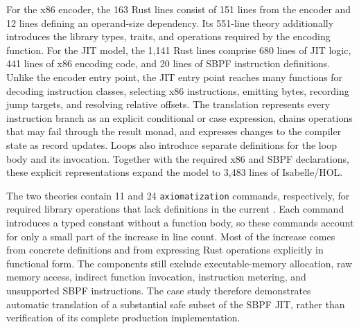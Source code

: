 For the x86 encoder, the 163 Rust lines consist of 151 lines from the encoder and 12 lines defining an operand-size dependency.
Its 551-line theory additionally introduces the library types, traits, and operations required by the encoding function.
For the JIT model, the 1,141 Rust lines comprise 680 lines of JIT logic, 441 lines of x86 encoding code, and 20 lines of SBPF instruction definitions.
Unlike the encoder entry point, the JIT entry point reaches many functions for decoding instruction classes, selecting x86 instructions, emitting bytes, recording jump targets, and resolving relative offsets.
The translation represents every instruction branch as an explicit conditional or case expression, chains operations that may fail through the result monad, and expresses changes to the compiler state as record updates.
Loops also introduce separate definitions for the loop body and its invocation.
Together with the required x86 and SBPF declarations, these explicit representations expand the model to 3,483 lines of Isabelle/HOL.


The two theories contain 11 and 24 \texttt{axiomatization} commands, respectively, for required library operations that lack definitions in the current \rprelude{}.
Each command introduces a typed constant without a function body, so these commands account for only a small part of the increase in line count.
Most of the increase comes from concrete definitions and from expressing Rust operations explicitly in functional form.
The components still exclude executable-memory allocation, raw memory access, indirect function invocation, instruction metering, and unsupported SBPF instructions.
The case study therefore demonstrates automatic translation of a substantial safe subset of the SBPF JIT, rather than verification of its complete production implementation.
